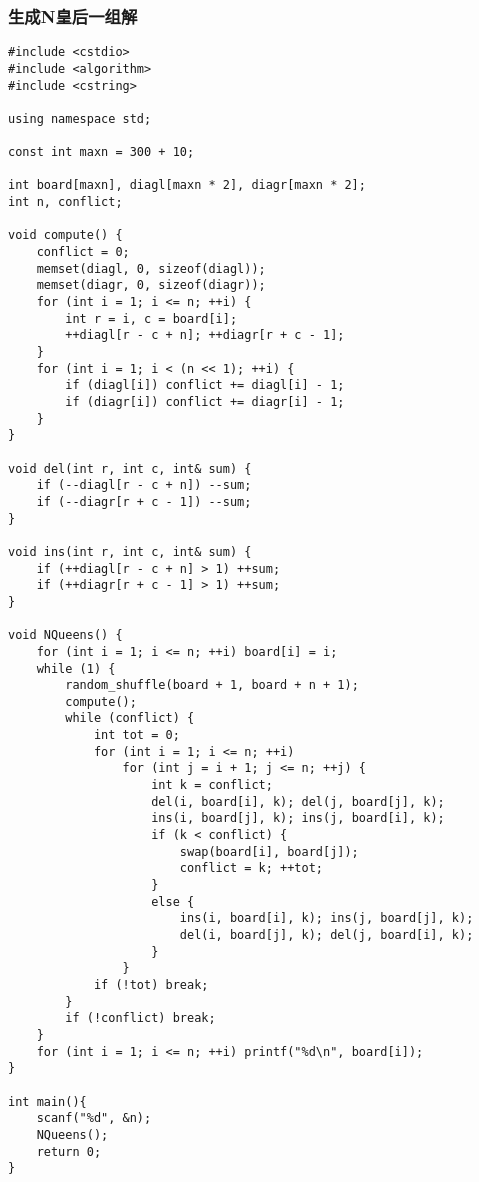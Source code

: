 \subsubsection{生成N皇后一组解}
\begin{verbatim}
#include <cstdio>
#include <algorithm>
#include <cstring>

using namespace std;

const int maxn = 300 + 10;

int board[maxn], diagl[maxn * 2], diagr[maxn * 2];
int n, conflict;

void compute() {
	conflict = 0;
	memset(diagl, 0, sizeof(diagl));
	memset(diagr, 0, sizeof(diagr));
	for (int i = 1; i <= n; ++i) {
		int r = i, c = board[i];
		++diagl[r - c + n]; ++diagr[r + c - 1];
	}
	for (int i = 1; i < (n << 1); ++i) {
		if (diagl[i]) conflict += diagl[i] - 1;
		if (diagr[i]) conflict += diagr[i] - 1;
	}
}

void del(int r, int c, int& sum) {
	if (--diagl[r - c + n]) --sum;
	if (--diagr[r + c - 1]) --sum;
}

void ins(int r, int c, int& sum) {
	if (++diagl[r - c + n] > 1) ++sum;
	if (++diagr[r + c - 1] > 1) ++sum;
}

void NQueens() {
	for (int i = 1; i <= n; ++i) board[i] = i;
	while (1) {
		random_shuffle(board + 1, board + n + 1);
		compute();
		while (conflict) {
			int tot = 0;
			for (int i = 1; i <= n; ++i)
				for (int j = i + 1; j <= n; ++j) {
					int k = conflict;
					del(i, board[i], k); del(j, board[j], k);
					ins(i, board[j], k); ins(j, board[i], k);
					if (k < conflict) {
						swap(board[i], board[j]);
						conflict = k; ++tot;
					}
					else {
						ins(i, board[i], k); ins(j, board[j], k);
						del(i, board[j], k); del(j, board[i], k);
					}
				}
			if (!tot) break;
		}
		if (!conflict) break;
	}
	for (int i = 1; i <= n; ++i) printf("%d\n", board[i]);
}

int main(){
	scanf("%d", &n);
	NQueens();
	return 0;
}
\end{verbatim}
